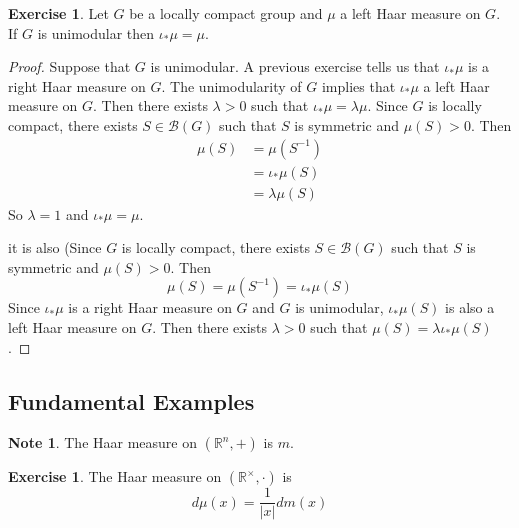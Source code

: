 \documentclass[12pt]{amsart}
\theoremstyle{definition}
\newtheorem{note}[definition]{Note}
\newtheorem{ex}[definition]{Exercise}
\newcommand{\lam}{\lambda}
\newcommand{\R}{\mathbb{R}}
\newcommand{\MB}{\mathcal{B}}
\newcommand{\lex}[1]{\label{ex:#1}}
\begin{document}
	\begin{ex} \lex{00000} 
		Let $G$ be a locally compact group and $\mu$ a left Haar measure on $G$. If $G$ is unimodular then $\iota_*\mu = \mu$.
	\end{ex}

	\begin{proof}
		Suppose that $G$ is unimodular. A previous exercise tells us that $\iota_*\mu$ is a right Haar measure on $G$. The unimodularity of $G$ implies that $\iota_*\mu$ a left Haar measure on $G$. Then there exists $\lam >0$ such that $\iota_*\mu = \lam \mu$. Since $G$ is locally compact, there exists $S \in \MB(G)$ such that $S$ is symmetric and $\mu(S) > 0$. Then 
		\begin{align*}
			\mu(S) 
			& = \mu(S^{-1}) \\
			& = \iota_*\mu(S) \\
			& = \lam \mu(S) 
		\end{align*}	
		So $\lam = 1$ and $\iota_*\mu = \mu$.

		it is also (Since $G$ is locally compact, there exists $S \in \MB(G)$ such that $S$ is symmetric and $\mu(S) > 0$. Then 
		$$\mu(S) = \mu(S^{-1}) = \iota_*\mu(S)$$ Since $\iota_*\mu$ is a right Haar measure on $G$ and $G$ is unimodular, $\iota_*\mu(S)$ is also a left Haar measure on $G$. Then there exists $\lam > 0$ such that $\mu(S) = \lam\iota_*\mu(S)$.
	\end{proof}




	
	



	
	
	
	
	
	
	
	\newpage
	\subsection{Fundamental Examples}		
	
	\begin{note}
		The Haar measure on  $(\R^n, +)$ is $m$.
	\end{note}
	
	\begin{ex} \lex{00000} 
		The Haar measure on $(\R^{\times}, \cdot)$  is $$d\mu(x) = \frac{1}{|x|} dm(x)$$
	\end{ex}
\end{document}
